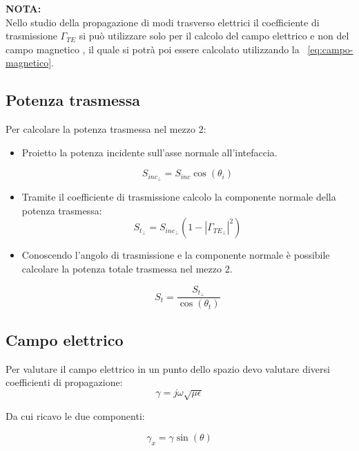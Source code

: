 \documentclass[10pt,a4paper]{report}
\begin{document}
			 \textbf{NOTA:}
			 \\ 
			 Nello studio della propagazione di modi trasverso elettrici il coefficiente di trasmissione $\Gamma_{TE}$ si può utilizzare solo per il calcolo del campo elettrico e non del campo magnetico , il quale si potrà poi essere calcolato utilizzando la ~\ref{eq:campo-magnetico}.

		\subsection{Potenza trasmessa}

			Per calcolare la potenza trasmessa nel mezzo 2:
			\begin{itemize}
			\item Proietto la potenza incidente sull'asse normale all'intefaccia.

			\begin{equation}
			S_{inc_\perp}=S_{inc}\cos(\theta_i)
			\end{equation}

			\item Tramite il coefficiente di trasmissione calcolo la componente normale della potenza trasmessa:
			\begin{equation}
			S_{t_\perp}=S_{inc_\perp}(1-|\Gamma_{TE_\perp}|^2)
			\end{equation}

			\item Conoscendo l'angolo di trasmissione e la componente normale è possibile calcolare la potenza totale trasmessa nel mezzo 2.

			\begin{equation}
			S_{t}=\frac{S_{t_\perp}}{\cos(\theta_t)}
			\end{equation}
			\end{itemize}
		\subsection{Campo elettrico}

			Per valutare il campo elettrico in un punto dello spazio devo valutare diversi coefficienti di propagazione:
			\begin{equation}
			\gamma=j\omega\sqrt{\mu\epsilon}\end{equation}

			Da cui ricavo le due componenti:

			\begin{equation}
			\gamma_x=\gamma\sin(\theta)
			\end{equation}
\end{document}
